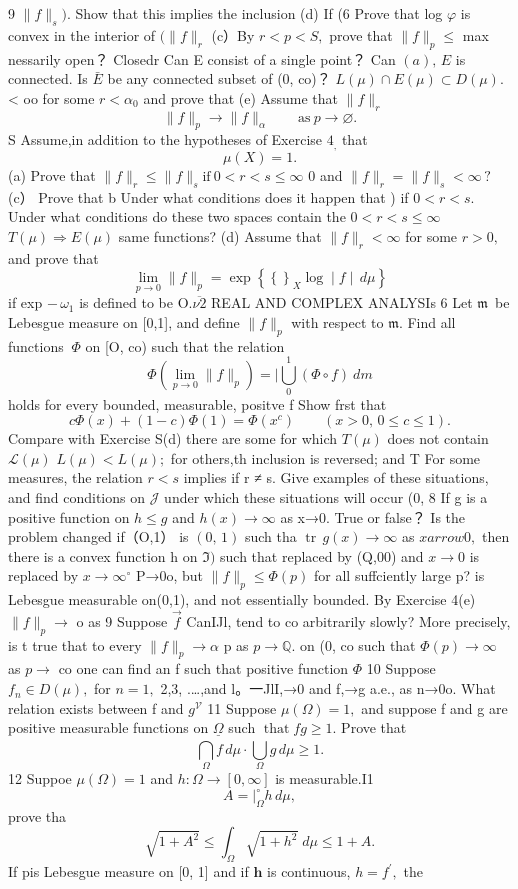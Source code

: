 9 $\|f\|_{s}).$ Show that this implies the inclusion (d) If (6 Prove that log $\textstyle{\varphi}$ is convex in the interior of $(\|f\|_{r}$ (c）By $r<p<S,$ prove that $\|f\|_{p}\leq$ max nessarily open？ Closedr Can E consist of a single point？ Can $(a),\,E$ is connected. Is $\bar{E}$ be any connected subset of (0, co)？ $L(\mu)\cap E(\mu)\subset D(\mu).$ < oo for some $r<\alpha_{0}$ and prove that (e) Assume that $\|f\|_{r}$ $$ \|f\|_{p}\to\|f\|_{\alpha}\qquad{\mathrm{as~}}p\to\varnothing. $$ S Assume,in addition to the hypotheses of Exercise $4_{\mathrm{,}}$ that $$ \mu(X)=1. $$ (a) Prove that $\|f\|_{r}\leq\|f\|_{s}{\mathrm{if}}\ 0<r<s\leq\infty$ 0 and $\|f\|_{r}=\|f\|_{s}<\infty\,?$ (c） Prove that b Under what conditions does it happen that ) if $\textstyle0<r<s.$ Under what conditions do these two spaces contain the $0<r<s\leq\infty$ $T(\mu)\Rightarrow E(\mu)$ same functions? (d) Assume that $\|f\|_{r}<\infty$ for some $r>0,$ and prove that $$ \operatorname*{lim}_{p\to0}\|f\|_{p}=\exp\left\{\left\{\right\}_{X}\log\mid f\mid\,d\mu\right\} $$ if exp $\scriptstyle-\,\omega_{1}$ is defined to be O.$\overline{{\nu2}}$ REAL AND COMPLEX ANALYSIs 6 Let ${\mathfrak{m}}\,$ be Lebesgue measure on [0,1], and define $\|f\|_{p}$ with respect to ${\mathfrak{m}}.$ Find all functions $\ \Phi$ on [O, co) such that the relation $$ \Phi(\operatorname*{lim}_{p\to0}\|f\|_{p})= |\bigcup_{0}^{1}(\Phi\circ f)\ d m $$ holds for every bounded, measurable, positve f Show frst that $$ c\Phi(x)+(1-c)\Phi(1)=\Phi(x^{c})\qquad(x>0,\,0\leq c\leq1). $$ Compare with Exercise S(d) there are some for which $T(\mu)$ does not contain ${\mathcal{L}}(\mu)$ $L(\mu)<L(\mu);$ for others,th inclusion is reversed; and T For some measures, the relation $r<s$ implies if r ≠ s. Give examples of these situations, and find conditions on $\mathcal{J}$ under which these situations will occur (0, 8 If g is a positive function on $h\leq g$ and $h(x)\to\infty$ as x→0. True or false？ Is the problem changed if（O,1） is $(0,\,1)$ such tha $\operatorname{tr}\,g(x)\to\infty$ as $x arrow0,$ then there is a convex function h on ${\mathfrak{I}})$ such that replaced by (Q,00) and $x\to0$ is replaced by $x\to\infty^{\circ}$ P→0o, but $\|f\|_{p}\leq\Phi(p)$ for all suffciently large p? is Lebesgue measurable on(0,1), and not essentially bounded. By Exercise 4(e) $\|f\|_{p}\to$ o as 9 Suppose $\scriptstyle{\vec{f}}$ CanIJl, tend to co arbitrarily slowly? More precisely, is t true that to every $\|f\|_{p}\to\alpha$ p as $p\to\mathbb{Q}.$ on (0, co such that $\Phi(p)\to\infty$ as $p\to$ co one can find an f such that positive function $\Phi$ 10 Suppose $f_{n}\in D(\mu),$ for $n=1,$ 2,3, .…,and l。一JlI,→0 and f,→g a.e., as n→0o. What relation exists between f and $g^{\mathcal{V}}$ 11 Suppose $\mu(\Omega)=1,$ and suppose f and g are positive measurable functions on $\underline{{\Omega}}$ such $\operatorname{that}f g\geq1.$ Prove that $$ \bigcap_{\Omega}f\,d\mu\cdot\bigcup_{\Omega}^{}g\,d\mu\geq1. $$ 12 Suppoe $\mu(\Omega)=1$ and $h\colon\Omega\to[0,\infty]$ is measurable.I1 $$ A= \vert_{\Omega}^{\circ}h\,d\mu, $$ prove tha $$ \sqrt{1+A^{2}}\leq\int_{\Omega}\sqrt{1+h^{2}}\;d\mu\leq1+A. $$ If pis Lebesgue measure on [0, 1] and if ${\boldsymbol{h}}$ is continuous, $h=f^{\prime},$ the 